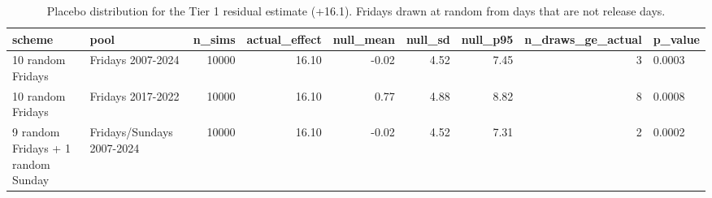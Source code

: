 \begin{table}
\caption{Placebo distribution for the Tier 1 residual estimate (+16.1). Fridays drawn at random from days that are not release days.}
\begin{tabular}{llrrrrrrl}
\toprule
scheme & pool & n\_sims & actual\_effect & null\_mean & null\_sd & null\_p95 & n\_draws\_ge\_actual & p\_value \\
\midrule
10 random Fridays & Fridays 2007-2024 & 10000 & 16.10 & -0.02 & 4.52 & 7.45 & 3 & 0.0003 \\
10 random Fridays & Fridays 2017-2022 & 10000 & 16.10 & 0.77 & 4.88 & 8.82 & 8 & 0.0008 \\
9 random Fridays + 1 random Sunday & Fridays/Sundays 2007-2024 & 10000 & 16.10 & -0.02 & 4.52 & 7.31 & 2 & 0.0002 \\
\bottomrule
\end{tabular}
\end{table}
